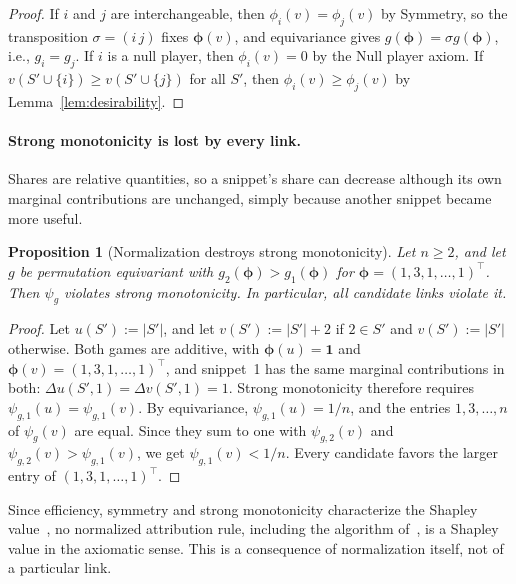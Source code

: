 \documentclass{article}
\newtheorem{proposition}{Proposition}
\begin{document}
\begin{proof}
If $i$ and $j$ are interchangeable, then $\phi_i(v) = \phi_j(v)$ by Symmetry, so the transposition $\sigma = (i\,j)$ fixes $\boldsymbol{\phi}(v)$, and equivariance gives $g(\boldsymbol{\phi}) = \sigma g(\boldsymbol{\phi})$, i.e., $g_i = g_j$. If $i$ is a null player, then $\phi_i(v) = 0$ by the Null player axiom. If $v(S' \cup \{i\}) \ge v(S' \cup \{j\})$ for all $S'$, then $\phi_i(v) \ge \phi_j(v)$ by Lemma~\ref{lem:desirability}.
\end{proof}

\paragraph{Strong monotonicity is lost by every link.}
Shares are relative quantities, so a snippet's share can decrease although its own marginal contributions are unchanged, simply because another snippet became more useful.

\begin{proposition}[Normalization destroys strong monotonicity]\label{prop:no_strong_monotonicity}
Let $n \ge 2$, and let $g$ be permutation equivariant with $g_2(\boldsymbol{\phi}) > g_1(\boldsymbol{\phi})$ for $\boldsymbol{\phi} = (1, 3, 1, \dots, 1)^\top$. Then $\psi_g$ violates strong monotonicity. In particular, all candidate links violate it.
\end{proposition}

\begin{proof}
Let $u(S') := |S'|$, and let $v(S') := |S'| + 2$ if $2 \in S'$ and $v(S') := |S'|$ otherwise. Both games are additive, with $\boldsymbol{\phi}(u) = \mathbf{1}$ and $\boldsymbol{\phi}(v) = (1, 3, 1, \dots, 1)^\top$, and snippet~1 has the same marginal contributions in both: $\Delta u(S', 1) = \Delta v(S', 1) = 1$. Strong monotonicity therefore requires $\psi_{g,1}(u) = \psi_{g,1}(v)$. By equivariance, $\psi_{g,1}(u) = 1/n$, and the entries $1, 3, \dots, n$ of $\psi_g(v)$ are equal. Since they sum to one with $\psi_{g,2}(v)$ and $\psi_{g,2}(v) > \psi_{g,1}(v)$, we get $\psi_{g,1}(v) < 1/n$. Every candidate favors the larger entry of $(1, 3, 1, \dots, 1)^\top$.
\end{proof}

Since efficiency, symmetry and strong monotonicity characterize the Shapley value~\cite{young1985monotonic}, no normalized attribution rule, including the algorithm of~\cite{nematov2025source}, is a Shapley value in the axiomatic sense. This is a consequence of normalization itself, not of a particular link.
\end{document}
